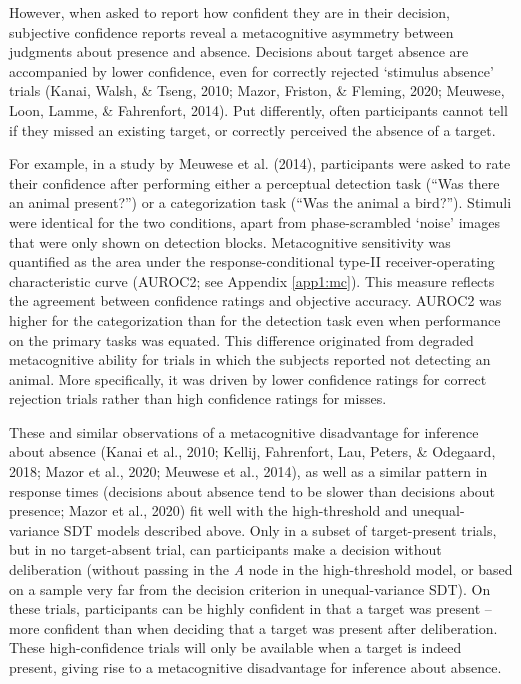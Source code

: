 \documentclass[12pt,twoside]{reedthesis}
\begin{document}
However, when asked to report how confident they are in their decision, subjective confidence reports reveal a metacognitive asymmetry between judgments about presence and absence. Decisions about target absence are accompanied by lower confidence, even for correctly rejected `stimulus absence' trials (Kanai, Walsh, \& Tseng, 2010; Mazor, Friston, \& Fleming, 2020; Meuwese, Loon, Lamme, \& Fahrenfort, 2014). Put differently, often participants cannot tell if they missed an existing target, or correctly perceived the absence of a target.

For example, in a study by Meuwese et al. (2014), participants were asked to rate their confidence after performing either a perceptual detection task (``Was there an animal present?'') or a categorization task (``Was the animal a bird?''). Stimuli were identical for the two conditions, apart from phase-scrambled `noise' images that were only shown on detection blocks. Metacognitive sensitivity was quantified as the area under the response-conditional type-II receiver-operating characteristic curve (AUROC2; see Appendix \ref{app1:mc}). This measure reflects the agreement between confidence ratings and objective accuracy. AUROC2 was higher for the categorization than for the detection task even when performance on the primary tasks was equated. This difference originated from degraded metacognitive ability for trials in which the subjects reported not detecting an animal. More specifically, it was driven by lower confidence ratings for correct rejection trials rather than high confidence ratings for misses.

These and similar observations of a metacognitive disadvantage for inference about absence (Kanai et al., 2010; Kellij, Fahrenfort, Lau, Peters, \& Odegaard, 2018; Mazor et al., 2020; Meuwese et al., 2014), as well as a similar pattern in response times (decisions about absence tend to be slower than decisions about presence; Mazor et al., 2020) fit well with the high-threshold and unequal-variance SDT models described above. Only in a subset of target-present trials, but in no target-absent trial, can participants make a decision without deliberation (without passing in the \emph{A} node in the high-threshold model, or based on a sample very far from the decision criterion in unequal-variance SDT). On these trials, participants can be highly confident in that a target was present -- more confident than when deciding that a target was present after deliberation. These high-confidence trials will only be available when a target is indeed present, giving rise to a metacognitive disadvantage for inference about absence.
\end{document}
